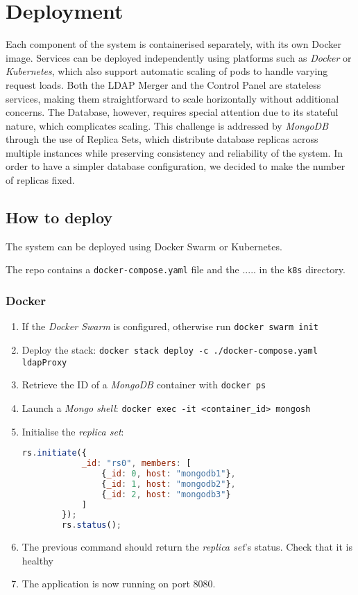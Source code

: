 \documentclass{scrartcl}
\begin{document}
\section{Deployment}

\par Each component of the system is containerised separately, with its own Docker image. Services can be deployed independently using platforms such as \textit{Docker} or \textit{Kubernetes}, which also support automatic scaling of pods to handle varying request loads. Both the LDAP Merger and the Control Panel are stateless services, making them straightforward to scale horizontally without additional concerns. The Database, however, requires special attention due to its stateful nature, which complicates scaling. This challenge is addressed by \textit{MongoDB} through the use of Replica Sets, which distribute database replicas across multiple instances while preserving consistency and reliability of the system. In order to have a simpler database configuration, we decided to make the number of replicas fixed.

\subsection{How to deploy}

\par The system can be deployed using Docker Swarm or Kubernetes.
\par The repo contains a \texttt{docker-compose.yaml} file and the ..... in the \texttt{k8s} directory.

\subsubsection{Docker}
\begin{enumerate}
	\item If the \textit{Docker Swarm} is configured, otherwise run \texttt{docker swarm init}
	\item Deploy the stack: \texttt{docker stack deploy -c ./docker-compose.yaml ldapProxy}
	\item Retrieve the ID of a \textit{MongoDB} container with \texttt{docker ps}
	\item Launch a \textit{Mongo shell}: \texttt{docker exec -it <container\_id> mongosh}
	\item Initialise the \textit{replica set}:
		\begin{lstlisting}[language=javascript]
		rs.initiate({
			_id: "rs0", members: [
				{_id: 0, host: "mongodb1"},
				{_id: 1, host: "mongodb2"},
				{_id: 2, host: "mongodb3"}
			]
		});
		rs.status();
		\end{lstlisting}
	\item The previous command should return the \textit{replica set}'s status. Check that it is healthy
	\item The application is now running on port 8080.
\end{enumerate}
\end{document}
